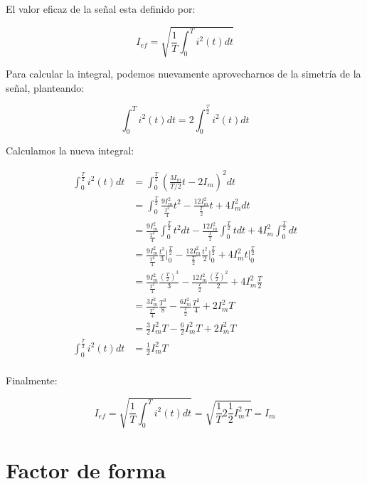 El valor eficaz de la señal esta definido por:

\begin{equation}
  I_{ef}= \sqrt{ \frac{1}{T} \int_0^T i^2(t) dt }
\end{equation}

Para calcular la integral, podemos nuevamente aprovecharnos de la simetría de la señal, planteando:

\begin{equation}
  \int_0^T i^2(t) dt = 2 \int_0^{\frac{T}{2}} i^2(t) dt
\end{equation}

Calculamos la nueva integral:

\begin{align*}
  \int_0^{\frac{T}{2}} i^2(t) dt &= \int_0^{\frac{T}{2}} \left(\frac{3I_m}{T/2} t - 2I_m\right)^2 dt\\
  &= \int_0^{\frac{T}{2}} \frac{9I_m^2}{\frac{T^2}{4}} t^2 - \frac{12 I_m^2}{\frac{T}{2}} t + 4I_m^2 dt\\
  &= \frac{9I_m^2}{\frac{T^2}{4}} \int_0^{\frac{T}{2}} t^2 dt - \frac{12 I_m^2}{\frac{T}{2}} \int_0^{\frac{T}{2}} t dt + 4I_m^2 \int_0^{\frac{T}{2}} dt\\
  &= \frac{9I_m^2}{\frac{T^2}{4}} \frac{t^3}{3} \bigg|_0^{\frac{T}{2}} - \frac{12 I_m^2}{\frac{T}{2}} \frac{t^2}{2} \bigg|_0^{\frac{T}{2}} + 4I_m^2 t \Big|_0^{\frac{T}{2}} \\
  &= \frac{9I_m^2}{\frac{T^2}{4}} \frac{\left(\frac{T}{2}\right)^3}{3} - \frac{12 I_m^2}{\frac{T}{2}} \frac{\left(\frac{T}{2}\right)^2}{2} + 4I_m^2 \frac{T}{2} \\
  &= \frac{3I_m^2}{\frac{T^2}{4}} \frac{T^3}{8} - \frac{6 I_m^2}{\frac{T}{2}} \frac{T^2}{4} + 2I_m^2 T \\
  &= \frac{3}{2} I_m^2T - \frac{6}{2} I_m^2 T + 2I_m^2 T \\
  \int_0^{\frac{T}{2}} i^2(t) dt &= \frac{1}{2} I_m^2 T\\
\end{align*}

Finalmente:

\begin{equation}
  I_{ef}= \sqrt{ \frac{1}{T} \int_0^T i^2(t) dt } = \sqrt{ \frac{1}{T} 2 \frac{1}{2} I_m^2 T} = I_m
\end{equation}

\section{Factor de forma}

